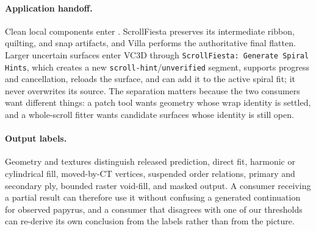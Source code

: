 \paragraph{Application handoff.} Clean local components enter . ScrollFiesta preserves its intermediate ribbon, quilting, and snap artifacts, and Villa performs the authoritative final flatten. Larger uncertain surfaces enter VC3D through \texttt{ScrollFiesta: Generate Spiral Hints}, which creates a new \texttt{scroll-hint}/\texttt{unverified} segment, supports progress and cancellation, reloads the surface, and can add it to the active spiral fit; it never overwrites its source. The separation matters because the two consumers want different things: a patch tool wants geometry whose wrap identity is settled, and a whole-scroll fitter wants candidate surfaces whose identity is still open.

\paragraph{Output labels.} Geometry and textures distinguish released prediction, direct fit, harmonic or cylindrical fill, moved-by-CT vertices, suspended order relations, primary and secondary ply, bounded raster void-fill, and masked output. A consumer receiving a partial result can therefore use it without confusing a generated continuation for observed papyrus, and a consumer that disagrees with one of our thresholds can re-derive its own conclusion from the labels rather than from the picture.
